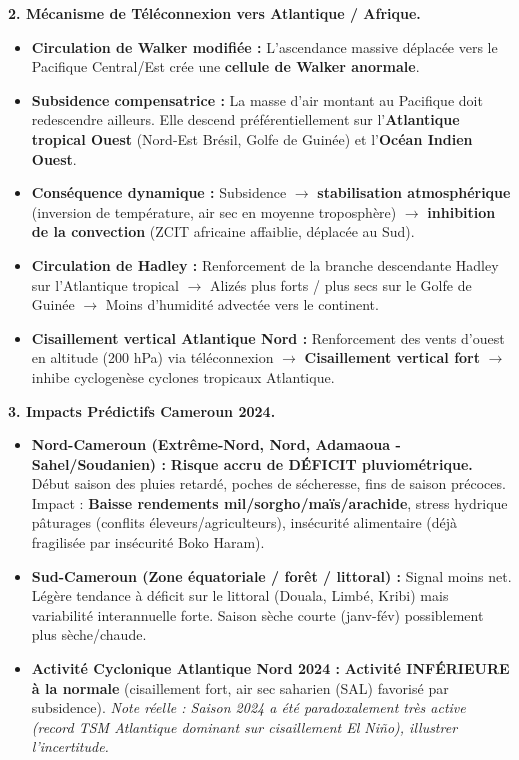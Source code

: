 \documentclass[11pt]{article}
\begin{document}
\begin{exoresolu}
\textbf{2. Mécanisme de Téléconnexion vers Atlantique / Afrique.}
\begin{itemize}
    \item \textbf{Circulation de Walker modifiée :} L'ascendance massive déplacée vers le Pacifique Central/Est crée une \textbf{cellule de Walker anormale}.
    \item \textbf{Subsidence compensatrice :} La masse d'air montant au Pacifique doit redescendre ailleurs. Elle descend préférentiellement sur l'\textbf{Atlantique tropical Ouest} (Nord-Est Brésil, Golfe de Guinée) et l'\textbf{Océan Indien Ouest}.
    \item \textbf{Conséquence dynamique :} Subsidence $\to$ \textbf{stabilisation atmosphérique} (inversion de température, air sec en moyenne troposphère) $\to$ \textbf{inhibition de la convection} (ZCIT africaine affaiblie, déplacée au Sud).
    \item \textbf{Circulation de Hadley :} Renforcement de la branche descendante Hadley sur l'Atlantique tropical $\to$ Alizés plus forts / plus secs sur le Golfe de Guinée $\to$ Moins d'humidité advectée vers le continent.
    \item \textbf{Cisaillement vertical Atlantique Nord :} Renforcement des vents d'ouest en altitude (200 hPa) via téléconnexion $\to$ \textbf{Cisaillement vertical fort} $\to$ inhibe cyclogenèse cyclones tropicaux Atlantique.
\end{itemize}

\textbf{3. Impacts Prédictifs Cameroun 2024.}
\begin{itemize}
    \item \textbf{Nord-Cameroun (Extrême-Nord, Nord, Adamaoua - Sahel/Soudanien) :} \textbf{Risque accru de DÉFICIT pluviométrique.} Début saison des pluies retardé, poches de sécheresse, fins de saison précoces. Impact : \textbf{Baisse rendements mil/sorgho/maïs/arachide}, stress hydrique pâturages (conflits éleveurs/agriculteurs), insécurité alimentaire (déjà fragilisée par insécurité Boko Haram).
    \item \textbf{Sud-Cameroun (Zone équatoriale / forêt / littoral) :} Signal moins net. Légère tendance à déficit sur le littoral (Douala, Limbé, Kribi) mais variabilité interannuelle forte. Saison sèche courte (janv-fév) possiblement plus sèche/chaude.
    \item \textbf{Activité Cyclonique Atlantique Nord 2024 :} \textbf{Activité INFÉRIEURE à la normale} (cisaillement fort, air sec saharien (SAL) favorisé par subsidence). \textit{Note réelle : Saison 2024 a été paradoxalement très active (record TSM Atlantique dominant sur cisaillement El Niño), illustrer l'incertitude.}
\end{itemize}


\end{exoresolu}
\end{document}
